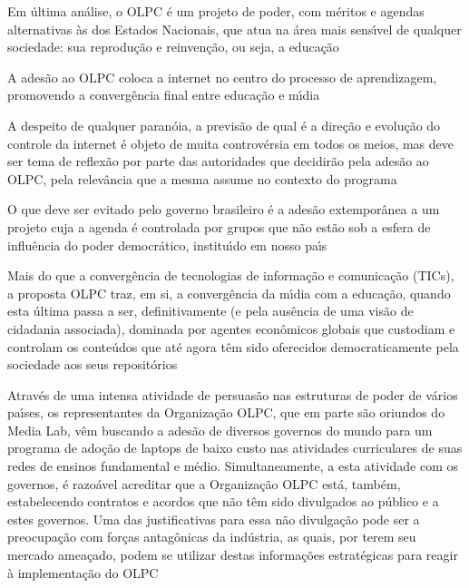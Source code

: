 \documentclass[
12pt,		%
openright,	%
twoside,  %
a4paper,			%
chapter=TITLE,		%
english,			%
french,				%
spanish,			%
brazil				%
]{USPSC-classe/USPSC}
\begin{document}
\begin{alineas}
\item \textquotedbl Em \'ultima an\'alise, o OLPC \'e um projeto de poder, com m\'eritos e agendas alternativas \`as dos Estados Nacionais, que atua na \'area mais sens\'{\i}vel de qualquer sociedade: sua reprodu\c{c}\~ao e reinven\c{c}\~ao, ou seja, a educa\c{c}\~ao\textquotedbl 
\item \textquotedbl A ades\~ao ao OLPC coloca a internet no centro do processo de aprendizagem, promovendo a converg\^encia final entre educa\c{c}\~ao e m\'{\i}dia\textquotedbl 
\item \textquotedbl A despeito de qualquer paran\'oia, a previs\~ao de qual \'e a dire\c{c}\~ao e evolu\c{c}\~ao do controle da internet \'e objeto de muita controv\'ersia em todos os meios, mas deve ser tema de reflex\~ao por parte das autoridades que decidir\~ao pela ades\~ao ao OLPC, pela relev\^ancia que a mesma assume no contexto do programa\textquotedbl 
\item \textquotedbl O que deve ser evitado pelo governo brasileiro \'e a ades\~ao extempor\^anea a um projeto cuja a agenda \'e controlada por grupos que n\~ao est\~ao sob a esfera de influ\^encia do poder democr\'atico, institu\'{\i}do em nosso pa\'{\i}s\textquotedbl 
\item \textquotedbl Mais do que a converg\^encia de tecnologias de informa\c{c}\~ao e comunica\c{c}\~ao (TICs), a proposta OLPC traz, em si, a converg\^encia da m\'{\i}dia com a educa\c{c}\~ao, quando esta \'ultima passa a ser, definitivamente (e pela aus\^encia de uma vis\~ao de cidadania associada), dominada por agentes econ\^omicos globais que custodiam e controlam os conte\'udos que at\'e agora t\^em sido oferecidos democraticamente pela sociedade aos seus reposit\'orios\textquotedbl 
\item \textquotedbl Atrav\'es de uma intensa atividade de persuas\~ao nas estruturas de poder de v\'arios pa\'{\i}ses, os representantes da Organiza\c{c}\~ao OLPC, que em parte s\~ao oriundos do Media Lab, v\^em buscando a ades\~ao de diversos governos do mundo para um programa de ado\c{c}\~ao de laptops de baixo custo nas atividades curriculares de suas redes de ensinos fundamental e m\'edio. Simultaneamente, a esta atividade com os governos, \'e razo\'avel acreditar que a Organiza\c{c}\~ao OLPC est\'a, tamb\'em, estabelecendo contratos e acordos que n\~ao t\^em sido divulgados ao p\'ublico e a estes governos. Uma das justificativas para essa n\~ao divulga\c{c}\~ao pode ser a preocupa\c{c}\~ao com for\c{c}as antag\^onicas da ind\'ustria, as quais, por terem seu mercado amea\c{c}ado, podem se utilizar destas informa\c{c}\~oes estrat\'egicas para reagir \`a implementa\c{c}\~ao do OLPC\textquotedbl 

\end{alineas}
\end{document}
